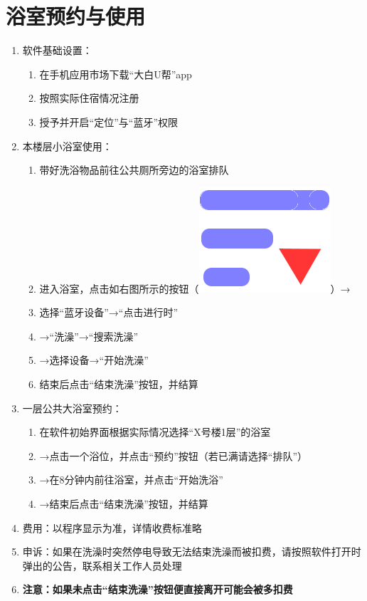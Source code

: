 \section[浴室预约与使用]{浴室预约与使用}
\label{wash_software}
\begin{enumerate}
    \item 软件基础设置：
          \begin{enumerate}[（1）]
              \item 在手机应用市场下载“大白U帮”app
              \item 按照实际住宿情况注册
              \item 授予并开启“定位”与“蓝牙”权限
          \end{enumerate}
    \item 本楼层小浴室使用：
          \begin{enumerate}[（1）]
              \item 带好洗浴物品前往公共厕所旁边的浴室排队
              \item 进入浴室，点击如右图所示的按钮（\mbox{\includegraphics[height=2.4ex]{bath.png}}）→
              \item 选择“蓝牙设备”→“点击进行时”
              \item →“洗澡”→“搜索洗澡”\footnotemark
              \item →选择设备\footnotemark →“开始洗澡”
              \item 结束后点击“结束洗澡”按钮，并结算
          \end{enumerate}
    \item 一层公共大浴室预约：
          \begin{enumerate}[（1）]
              \item 在软件初始界面根据实际情况选择“X号楼1层”的浴室
              \item →点击一个浴位，并点击“预约”按钮（若已满请选择“排队”）
              \item →在8分钟内前往浴室，并点击“开始洗浴”
              \item →结束后点击“结束洗澡”按钮，并结算
          \end{enumerate}
    \item 费用：以程序显示为准，详情收费标准略
    \item 申诉：如果在洗澡时突然停电导致无法结束洗澡而被扣费，请按照软件打开时弹出的公告，联系相关工作人员处理
    \item \textbf{注意：如果未点击“结束洗澡”按钮便直接离开可能会被多扣费}
\end{enumerate}

